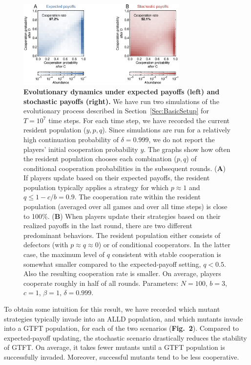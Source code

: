 \documentclass[11pt]{article}
\newcommand{\FigInvAnalysis}{{\bf Fig.~2}}
\theoremstyle{plainCl1}
\theoremstyle{plainCl2}
\begin{document}
\begin{figure}[t!]
\centering
\includegraphics[width=0.75\textwidth]{Fig1} 
\caption{{\bf Evolutionary dynamics under expected payoffs (left) and stochastic payoffs (right).} 
We have run two simulations of the evolutionary process described in Section~\ref{Sec:BasicSetup} for $T\!=\!10^7$ time steps. For each time step, we have recorded the current resident population ($y,p,q$). Since simulations are run for a relatively high continuation probability of $\delta\!=\!0.999$, we do not report the players' initial cooperation probability $y$. The graphs show how often the resident population chooses each combination ($p,q$) of conditional cooperation probabilities in the subsequent rounds. ({\bf A}) If players update based on their expected payoffs, the resident population typically applies a strategy for which $p\!\approx\!1$ and $q\!\le\!1\!-\!c/b\!=\!0.9$. The cooperation rate within the resident population (averaged over all games and over all time steps) is close to 100\%. ({\bf B}) When players update their strategies based on their realized payoffs in the last round, there are two different predominant behaviors. The resident population either consists of defectors (with $p\!\approx\!q\!\approx\!0$) or of conditional cooperators. In the latter case, the maximum level of $q$ consistent with stable cooperation is somewhat smaller compared to the expected-payoff setting, $q\!<\!0.5$. Also the resulting cooperation rate is smaller. On average, players cooperate roughly in half of all rounds. Parameters: $N\!=\!100$, $b\!=\!3$, $c\!=\!1$, $\beta\!=\!1$, $\delta\!=\!0.999$.}
\end{figure}

To obtain some intuition for this result, we have recorded which mutant strategies typically invade into an ALLD population, and which mutants invade into a GTFT population, for each of the two scenarios (\FigInvAnalysis). Compared to expected-payoff updating, the stochastic scenario drastically reduces the stability of GTFT. On average, it takes fewer mutants until a GTFT population is successfully invaded. Moreover, successful mutants  tend to be less cooperative. 
\end{document}
